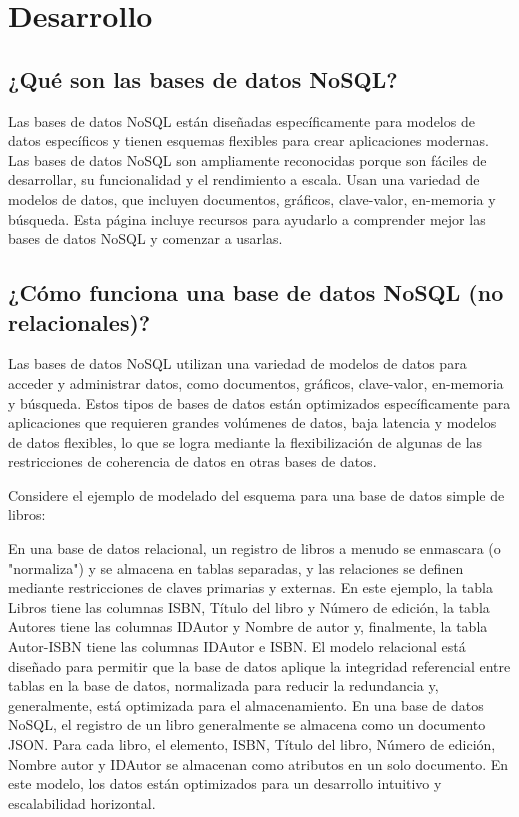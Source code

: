 \documentclass[twoside,twocolumn]{article}
\begin{document}
\section{Desarrollo}

\subsection{¿Qué son las bases de datos NoSQL?}

Las bases de datos NoSQL están diseñadas específicamente para modelos de datos específicos y tienen esquemas flexibles para crear aplicaciones modernas. Las bases de datos NoSQL son ampliamente reconocidas porque son fáciles de desarrollar, su funcionalidad y el rendimiento a escala. Usan una variedad de modelos de datos, que incluyen documentos, gráficos, clave-valor, en-memoria y búsqueda. Esta página incluye recursos para ayudarlo a comprender mejor las bases de datos NoSQL y comenzar a usarlas.

\subsection{¿Cómo funciona una base de datos NoSQL (no relacionales)?}

Las bases de datos NoSQL utilizan una variedad de modelos de datos para acceder y administrar datos, como documentos, gráficos, clave-valor, en-memoria y búsqueda. Estos tipos de bases de datos están optimizados específicamente para aplicaciones que requieren grandes volúmenes de datos, baja latencia y modelos de datos flexibles, lo que se logra mediante la flexibilización de algunas de las restricciones de coherencia de datos en otras bases de datos.

Considere el ejemplo de modelado del esquema para una base de datos simple de libros:

En una base de datos relacional, un registro de libros a menudo se enmascara (o "normaliza") y se almacena en tablas separadas, y las relaciones se definen mediante restricciones de claves primarias y externas. En este ejemplo, la tabla Libros tiene las columnas ISBN, Título del libro y Número de edición, la tabla Autores tiene las columnas IDAutor y Nombre de autor y, finalmente, la tabla Autor-ISBN tiene las columnas IDAutor e ISBN. El modelo relacional está diseñado para permitir que la base de datos aplique la integridad referencial entre tablas en la base de datos, normalizada para reducir la redundancia y, generalmente, está optimizada para el almacenamiento.
En una base de datos NoSQL, el registro de un libro generalmente se almacena como un documento JSON. Para cada libro, el elemento, ISBN, Título del libro, Número de edición, Nombre autor y IDAutor se almacenan como atributos en un solo documento. En este modelo, los datos están optimizados para un desarrollo intuitivo y escalabilidad horizontal.
\end{document}
